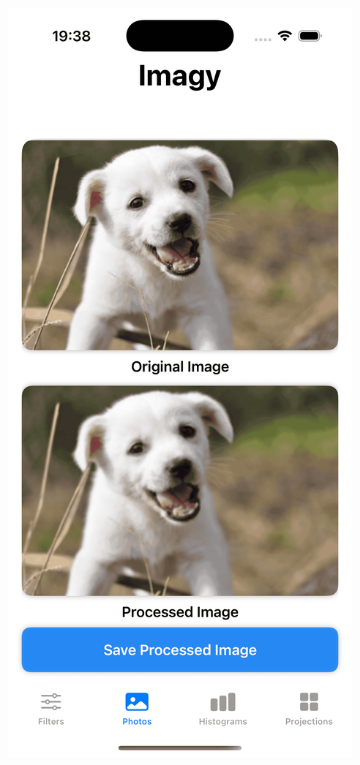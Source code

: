 \documentclass[a4paper]{article}
\begin{document}
\begin{itemize}
\begin{figure}[H]
\begin{subfigure}{0.2\textwidth}
                  \includegraphics[width=\linewidth]{images/dog_averaging_3.png}

\end{subfigure}
\end{figure}
\end{itemize}
\end{document}
